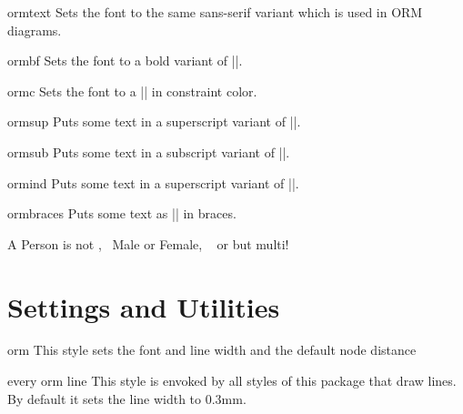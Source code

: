 \documentclass[a4paper,10pt]{article}
\begin{document}
\begin{command}{ormtext}
Sets the font to the same sans-serif variant which is used in ORM diagrams.
\end{command}

\begin{command}{ormbf}
Sets the font to a bold variant of |\ormtext|.
\end{command}

\begin{command}{ormc}
Sets the font to a |\ormtext| in constraint color.
\end{command}

\begin{command}{ormsup}
Puts some text in a superscript variant of |\ormtext|.
\end{command}

\begin{command}{ormsub}
Puts some text in a subscript variant of |\ormtext|.
\end{command}

\begin{command}{ormind}
Puts some text in a superscript variant of |\ormbf|.
\end{command}

\begin{command}{ormbraces}
Puts some text as |\ormtext| in braces.
\end{command}

\begin{codeexample}[]
A {\ormtext Person} is not ,~
{\ormc Male} {\ormbf or} {\ormtext Female}, ~
{\ormbf or}  but multi!
\end{codeexample}


\section{Settings and Utilities}
\label{sec:generalstyles}

\begin{stylekey}{orm}
  This style sets the font and line width and the default node distance
\end{stylekey}

\begin{stylekey}{every orm line}
  This style is envoked by all styles of this package that draw lines. By default it sets the line width to 0.3mm.
\end{stylekey}
\end{document}
